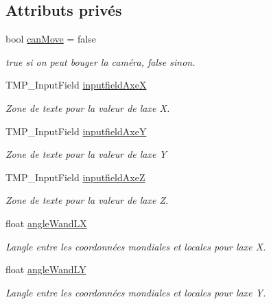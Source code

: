 \subsection*{Attributs privés}
\begin{DoxyCompactItemize}
\item 
bool \mbox{\hyperlink{class_camera_control_a0c3fa77bacbeb5a6735e6d572dbbce67}{can\+Move}} = false
\begin{DoxyCompactList}\small\item\em true si on peut bouger la caméra, false sinon. \end{DoxyCompactList}\item 
T\+M\+P\+\_\+\+Input\+Field \mbox{\hyperlink{class_camera_control_a24aa30171f6590bed8ed45679a3bc385}{inputfield\+AxeX}}
\begin{DoxyCompactList}\small\item\em Zone de texte pour la valeur de l\textquotesingle{}axe X. \end{DoxyCompactList}\item 
T\+M\+P\+\_\+\+Input\+Field \mbox{\hyperlink{class_camera_control_a780f2ed07f0991caeced5645adfc44f3}{inputfield\+AxeY}}
\begin{DoxyCompactList}\small\item\em Zone de texte pour la valeur de l\textquotesingle{}axe Y \end{DoxyCompactList}\item 
T\+M\+P\+\_\+\+Input\+Field \mbox{\hyperlink{class_camera_control_a341e48bda7a5a7117d90ae30643ad006}{inputfield\+AxeZ}}
\begin{DoxyCompactList}\small\item\em Zone de texte pour la valeur de l\textquotesingle{}axe Z. \end{DoxyCompactList}\item 
float \mbox{\hyperlink{class_camera_control_aee03964cb85279922b7a0dac9395f8d7}{angle\+Wand\+LX}}
\begin{DoxyCompactList}\small\item\em L\textquotesingle{}angle entre les coordonnées mondiales et locales pour l\textquotesingle{}axe X. \end{DoxyCompactList}\item 
float \mbox{\hyperlink{class_camera_control_a07fe5546ad908b642ef5c96f810db6b3}{angle\+Wand\+LY}}
\begin{DoxyCompactList}\small\item\em L\textquotesingle{}angle entre les coordonnées mondiales et locales pour l\textquotesingle{}axe Y. \end{DoxyCompactList}\item 

\end{DoxyCompactItemize}
